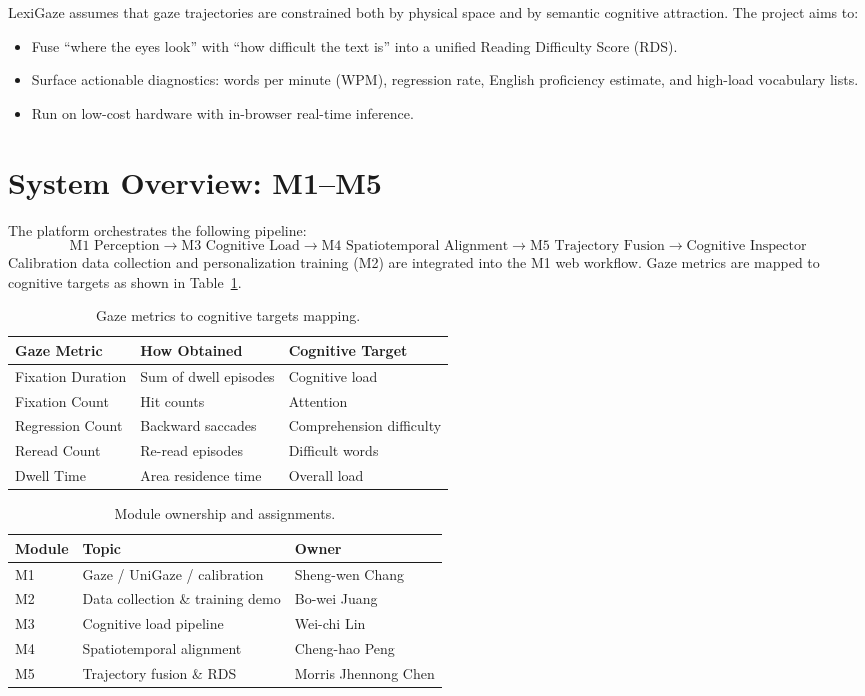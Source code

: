 \documentclass[sigconf]{acmart}
\begin{document}
LexiGaze assumes that gaze trajectories are constrained both by physical space and by semantic cognitive attraction. The project aims to:
\begin{itemize}
    \item Fuse ``where the eyes look'' with ``how difficult the text is'' into a unified Reading Difficulty Score (RDS).
    \item Surface actionable diagnostics: words per minute (WPM), regression rate, English proficiency estimate, and high-load vocabulary lists.
    \item Run on low-cost hardware with in-browser real-time inference.
\end{itemize}

\section{System Overview: M1--M5}
The platform orchestrates the following pipeline:
\begin{displaymath}
\text{M1 Perception} \rightarrow \text{M3 Cognitive Load} \rightarrow \text{M4 Spatiotemporal Alignment} \rightarrow \text{M5 Trajectory Fusion} \rightarrow \text{Cognitive Inspector}
\end{displaymath}
Calibration data collection and personalization training (M2) are integrated into the M1 web workflow. Gaze metrics are mapped to cognitive targets as shown in Table~\ref{tab:gaze_metrics}.

\begin{table}[h]
\centering
\caption{Gaze metrics to cognitive targets mapping.}
\label{tab:gaze_metrics}
\begin{tabular}{lll}
\toprule
Gaze Metric & How Obtained & Cognitive Target \\
\midrule
Fixation Duration & Sum of dwell episodes & Cognitive load \\
Fixation Count & Hit counts & Attention \\
Regression Count & Backward saccades & Comprehension difficulty \\
Reread Count & Re-read episodes & Difficult words \\
Dwell Time & Area residence time & Overall load \\
\bottomrule
\end{tabular}
\end{table}

\begin{table}[h]
\centering
\caption{Module ownership and assignments.}
\label{tab:ownership}
\begin{tabular}{lll}
\toprule
Module & Topic & Owner \\
\midrule
M1 & Gaze / UniGaze / calibration & Sheng-wen Chang \\
M2 & Data collection \& training demo & Bo-wei Juang \\
M3 & Cognitive load pipeline & Wei-chi Lin \\
M4 & Spatiotemporal alignment & Cheng-hao Peng \\
M5 & Trajectory fusion \& RDS & Morris Jhennong Chen \\
\bottomrule
\end{tabular}
\end{table}
\end{document}
